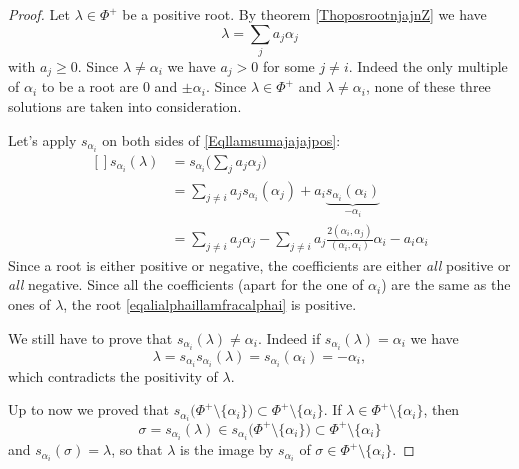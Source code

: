 \begin{proof}
    Let \( \lambda\in\Phi^+\) be a positive root. By theorem \ref{ThoposrootnjajnZ} we have
    \begin{equation}        \label{Eqllamsumajajajpos}
        \lambda=\sum_ja_j\alpha_j
    \end{equation}
    with \( a_j\geq 0\). Since \( \lambda\neq\alpha_i\) we have \( a_j>0\) for some \( j\neq i\). Indeed the only multiple of \( \alpha_i\) to be a root are \( 0\) and \( \pm\alpha_i\). Since \( \lambda\in\Phi^+\) and \( \lambda\neq \alpha_i\), none of these three solutions are taken into consideration.
    
    Let's apply \( s_{\alpha_i}\) on both sides of \eqref{Eqllamsumajajajpos}:
    \begin{equation}        \label{eqalialphaillamfracalphai}
        \begin{aligned}[]
            s_{\alpha_i}(\lambda)&=s_{\alpha_i}\big( \sum_ja_j\alpha_j \big)\\
            &=\sum_{j\neq i}a_js_{\alpha_i}(\alpha_j)+a_i\underbrace{s_{\alpha_i}(\alpha_i)}_{-\alpha_i}\\
            &=\sum_{j\neq i}a_j\alpha_j-\sum_{j\neq i}a_j\frac{ 2(\alpha_i,\alpha_j) }{ (\alpha_i,\alpha_i) }\alpha_i-a_i\alpha_i
        \end{aligned}
    \end{equation}
    Since a root is either positive or negative, the coefficients are either \emph{all} positive or \emph{all} negative. Since all the coefficients (apart for the one of \( \alpha_i\)) are the same as the ones of \( \lambda\), the root \eqref{eqalialphaillamfracalphai} is positive.

    We still have to prove that \( s_{\alpha_i}(\lambda)\neq \alpha_i\). Indeed if \( s_{\alpha_i}(\lambda)=\alpha_i\) we have
    \begin{equation}
        \lambda=s_{\alpha_i}s_{\alpha_i}(\lambda)=s_{\alpha_i}(\alpha_i)=-\alpha_i,
    \end{equation}
    which contradicts the positivity of \( \lambda\).

    Up to now we proved that \( s_{\alpha_i}\big( \Phi^+\setminus\{ \alpha_i \} \big)\subset\Phi^+\setminus\{ \alpha_i \}\). If \( \lambda\in\Phi^+\setminus\{ \alpha_i \}\), then
    \begin{equation}
        \sigma=s_{\alpha_i}(\lambda)\in s_{\alpha_i}\big( \Phi^+\setminus\{ \alpha_i \} \big)\subset\Phi^+\setminus\{ \alpha_i \}
    \end{equation}
    and \( s_{\alpha_i}(\sigma)=\lambda\), so that \( \lambda\) is the image by \( s_{\alpha_i}\) of \( \sigma\in\Phi^+\setminus\{ \alpha_i \}\).
\end{proof}

